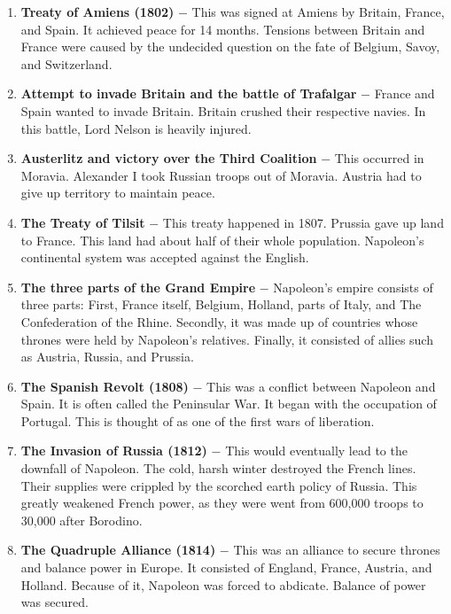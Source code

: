 \documentclass[12pt]{article}
\begin{document}
\begin{enumerate}
\item \textbf{Treaty of Amiens (1802)} $-$ This was signed at Amiens by Britain, France, and Spain. It achieved peace for 14 months. Tensions between Britain and France were caused by the undecided question on the fate of Belgium, Savoy, and Switzerland.

\item \textbf{Attempt to invade Britain and the battle of Trafalgar} $-$ France and Spain wanted to invade Britain. Britain crushed their respective navies. In this battle, Lord Nelson is heavily injured.

\item \textbf{Austerlitz and victory over the Third Coalition} $-$ This occurred in Moravia. Alexander I took Russian troops out of Moravia. Austria had to give up territory to maintain peace.

\item \textbf{The Treaty of Tilsit} $-$ This treaty happened in 1807. Prussia gave up land to France. This land had about half of their whole population. Napoleon's continental system was accepted against the English.

\item \textbf{The three parts of the Grand Empire} $-$ Napoleon's empire consists of three parts: First, France itself, Belgium, Holland, parts of Italy, and The Confederation of the Rhine. Secondly, it was made up of countries whose thrones were held by Napoleon's relatives. Finally, it consisted of allies such as Austria, Russia, and Prussia.

\item \textbf{The Spanish Revolt (1808)} $-$ This was a conflict between Napoleon and Spain. It is often called the Peninsular War. It began with the occupation of Portugal. This is thought of as one of the first wars of liberation.

\item \textbf{The Invasion of Russia (1812)} $-$ This would eventually lead to the downfall of Napoleon. The cold, harsh winter destroyed the French lines. Their supplies were crippled by the scorched earth policy of Russia. This greatly weakened French power, as they were went from 600,000 troops to 30,000 after Borodino.

\item \textbf{The Quadruple Alliance (1814)} $-$ This was an alliance to secure thrones and balance power in Europe. It consisted of England, France, Austria, and Holland. Because of it, Napoleon was forced to abdicate. Balance of power was secured.


\end{enumerate}
\end{document}
